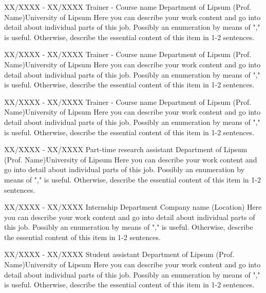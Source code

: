 \begin{paracol}{2}
\begin{rightcolumn}
	\cvevent
	{XX/XXXX - XX/XXXX}
		{Trainer - Course name}
		{Department of Lipsum (Prof. Name)\newline University of Lipsum}
		{Here you can describe your work content and go into detail about individual parts of this job. Possibly an enumeration by means of "," is useful. Otherwise, describe the essential content of this item in 1-2 sentences.}
		\vfill\null



	\cvevent
		{XX/XXXX - XX/XXXX}
		{Trainer - Course name}
		{Department of Lipsum (Prof. Name)\newline University of Lipsum}
		{Here you can describe your work content and go into detail about individual parts of this job. Possibly an enumeration by means of ","  is useful. Otherwise, describe the essential content of this item in 1-2 sentences.}
		\vfill\null
		\vfill\null



	\cvevent
	{XX/XXXX - XX/XXXX}
		{Trainer - Course name}
		{Department of Lipsum (Prof. Name)\newline University of Lipsum}
		{Here you can describe your work content and go into detail about individual parts of this job. Possibly an enumeration by means of "," is useful. Otherwise, describe the essential content of this item in 1-2 sentences.}
		\vfill\null


	\cvevent
	{XX/XXXX - XX/XXXX}
		{Part-time research assistant}
		{Department of Lipsum (Prof. Name)\newline University of Lipsum}
		{Here you can describe your work content and go into detail about individual parts of this job. Possibly an enumeration by means of "," is useful. Otherwise, describe the essential content of this item in 1-2 sentences.}
		\vfill\null



	\cvevent
	{XX/XXXX - XX/XXXX}
		{Internship}
		{Department \newline Company name (Location)}
		{Here you can describe your work content and go into detail about individual parts of this job. Possibly an enumeration by means of "," is useful. Otherwise, describe the essential content of this item in 1-2 sentences.}
		\vfill\null

	\cvevent
	{XX/XXXX - XX/XXXX}
		{Student assistant}
		{Department of Lipsum (Prof. Name)\newline University of Lipsum}
		{Here you can describe your work content and go into detail about individual parts of this job. Possibly an enumeration by means of "," is useful. Otherwise, describe the essential content of this item in 1-2 sentences.}
		\vfill\null



\end{rightcolumn}
\end{paracol}
